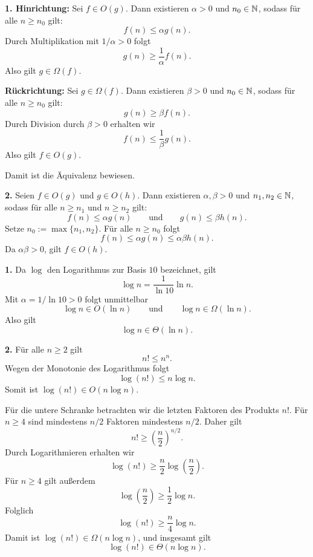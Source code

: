 \documentclass{report}
\begin{document}
\begin{myproof}
  \textbf{1. Hinrichtung:}
  Sei \(f\in O(g)\). Dann existieren \(\alpha>0\) und
  \(n_0\in\mathbb{N}\), sodass für alle \(n\ge n_0\) gilt:
  \[
    f(n)\le \alpha g(n).
  \]
  Durch Multiplikation mit \(1/\alpha>0\) folgt
  \[
    g(n)\ge \frac{1}{\alpha}f(n).
  \]
  Also gilt \(g\in\Omega(f)\).

  \textbf{Rückrichtung:}
  Sei \(g\in\Omega(f)\). Dann existieren \(\beta>0\) und
  \(n_0\in\mathbb{N}\), sodass für alle \(n\ge n_0\) gilt:
  \[
    g(n)\ge \beta f(n).
  \]
  Durch Division durch \(\beta>0\) erhalten wir
  \[
    f(n)\le \frac{1}{\beta}g(n).
  \]
  Also gilt \(f\in O(g)\).

  Damit ist die Äquivalenz bewiesen.

  \medskip
  \textbf{2.}
  Seien \(f\in O(g)\) und \(g\in O(h)\). Dann existieren
  \(\alpha,\beta>0\) und \(n_1,n_2\in\mathbb{N}\), sodass für alle
  \(n\ge n_1\) und \(n\ge n_2\) gilt:
  \[
    f(n)\le \alpha g(n)
    \qquad\text{und}\qquad
    g(n)\le \beta h(n).
  \]
  Setze \(n_0:=\max\{n_1,n_2\}\). Für alle \(n\ge n_0\) folgt
  \[
    f(n)\le \alpha g(n)
    \le \alpha\beta h(n).
  \]
  Da \(\alpha\beta>0\), gilt \(f\in O(h)\).
\end{myproof}


\begin{myproof}
  \textbf{1.}
  Da \(\log\) den Logarithmus zur Basis \(10\) bezeichnet, gilt
  \[
    \log n=\frac{1}{\ln 10}\ln n.
  \]
  Mit \(\alpha=1/\ln 10>0\) folgt unmittelbar
  \[
    \log n\in O(\ln n)
    \qquad\text{und}\qquad
    \log n\in\Omega(\ln n).
  \]
  Also gilt
  \[
    \log n\in\Theta(\ln n).
  \]

  \medskip
  \textbf{2.}
  Für alle \(n\ge 2\) gilt
  \[
    n!\le n^n.
  \]
  Wegen der Monotonie des Logarithmus folgt
  \[
    \log(n!)\le n\log n.
  \]
  Somit ist \(\log(n!)\in O(n\log n)\).

  Für die untere Schranke betrachten wir die letzten Faktoren
  des Produkts \(n!\). Für \(n\ge 4\) sind mindestens \(n/2\)
  Faktoren mindestens \(n/2\). Daher gilt
  \[
    n!\ge \left(\frac n2\right)^{n/2}.
  \]
  Durch Logarithmieren erhalten wir
  \[
    \log(n!)
    \ge \frac n2\log\left(\frac n2\right).
  \]
  Für \(n\ge 4\) gilt außerdem
  \[
    \log\left(\frac n2\right)\ge \frac12\log n.
  \]
  Folglich
  \[
    \log(n!)\ge \frac n4\log n.
  \]
  Damit ist \(\log(n!)\in\Omega(n\log n)\), und insgesamt gilt
  \[
    \log(n!)\in\Theta(n\log n).
  \]
\end{myproof}
\end{document}

